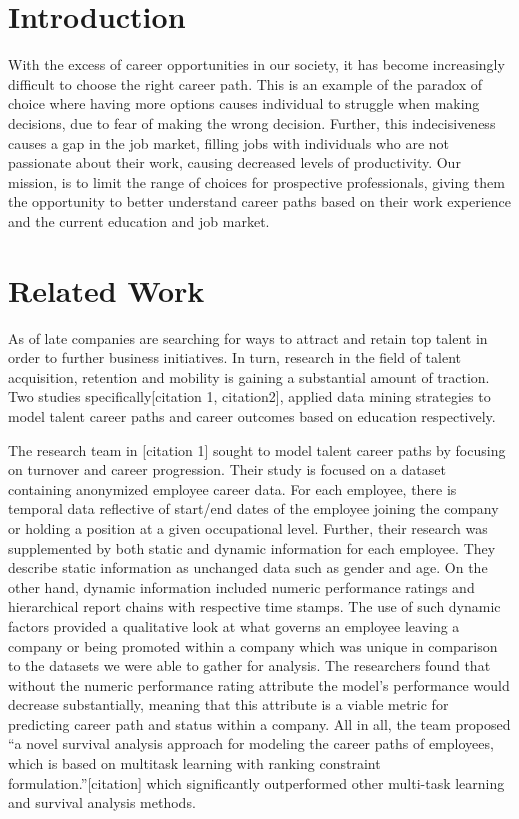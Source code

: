 \section{Introduction}
With the excess of career opportunities in our society, it has become increasingly difficult to choose the right career path. This is an example of  the paradox of choice where having more options causes individual to struggle when making decisions, due to fear of making the wrong decision. Further, this indecisiveness causes a gap in the job market, filling jobs with individuals who are not passionate about their work, causing decreased levels of productivity. Our mission, is to limit the range of choices for prospective professionals, giving them the opportunity to better understand career paths based on their work experience and the current education and job market. 

\section{Related Work}
As of late companies are searching for ways to attract and retain top talent in order to further business initiatives. In turn,  research in the field of talent acquisition, retention and mobility is gaining a substantial amount of traction. Two studies specifically[citation 1, citation2], applied data mining strategies to model talent career paths and career outcomes based on education respectively. 

The research team in [citation 1] sought to model talent career paths by focusing on turnover and career progression. Their study is focused on a dataset containing anonymized employee career data. For each employee, there is temporal data reflective of start/end dates of the employee joining the company or holding a position at a given occupational level. Further, their research was supplemented by both static and dynamic information for each employee. They describe static information as unchanged data such as gender and age. On the other hand, dynamic information included numeric performance ratings and hierarchical report chains with respective time stamps. The use of such dynamic factors provided a qualitative look at what governs an employee leaving a company or being promoted within a company which was unique in comparison to the datasets we were able to gather for analysis. The researchers found that without the numeric performance rating attribute the model’s performance would decrease substantially, meaning that this attribute is a viable metric for predicting career path and status within a company.  All in all, the team proposed “a novel survival analysis approach for modeling the career paths of employees, which is based on multitask learning with ranking constraint formulation.”[citation] which significantly outperformed other multi-task learning and survival analysis methods. 

